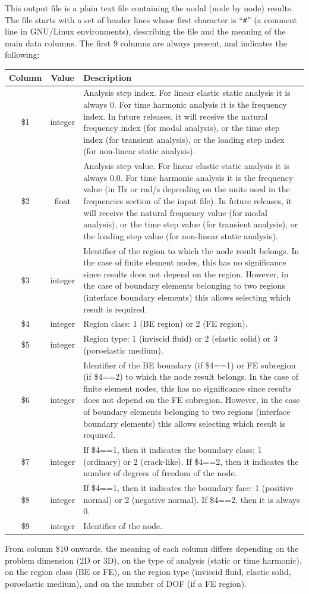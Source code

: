 \documentclass[a4paper,fleqn]{book}
\begin{document}
This output file is a plain text file containing the nodal (node by node) results. The file starts with a set of header lines whose first character is ``\texttt{\#}'' (a comment line in GNU/Linux environments), describing the file and the meaning of the main data columns. The first 9 columns are always present, and indicates the following:
\begin{longtable}{ccp{11cm}}
\textbf{Column} & \textbf{Value} &\textbf{Description} \\ 
\endhead
\midrule
\$1 & integer & Analysis step index. For linear elastic static analysis it is always 0. For time harmonic analysis it is the frequency index. In future releases, it will receive the natural frequency index (for modal analysis), or the time step index (for transient analysis), or the loading step index (for non-linear static analysis). \\
\$2 & float & Analysis step value. For linear elastic static analysis it is always 0.0. For time harmonic analysis it is the frequency value (in Hz or rad/s depending on the units used in the frequencies section of the input file). In future releases, it will receive the natural frequency value (for modal analysis), or the time step value (for transient analysis), or the loading step value (for non-linear static analysis). \\
\$3 & integer & Identifier of the region to which the node result belongs. In the case of finite element nodes, this has no significance since results does not depend on the region. However, in the case of boundary elements belonging to two regions (interface boundary elements) this allows selecting which result is required. \\
\$4 & integer & Region class: 1 (BE region) or 2 (FE region). \\
\$5 & integer & Region type: 1 (inviscid fluid) or 2 (elastic solid) or 3 (poroelastic medium). \\
\$6 & integer & Identifier of the BE boundary (if \$4==1) or FE subregion (if \$4==2) to which the node result belongs. In the case of finite element nodes, this has no significance since results does not depend on the FE subregion. However, in the case of boundary elements belonging to two regions (interface boundary elements) this allows selecting which result is required. \\
\$7 & integer & If \$4==1, then it indicates the boundary class: 1 (ordinary) or 2 (crack-like). If \$4==2, then it indicates the number of degrees of freedom of the node. \\
\$8 & integer & If \$4==1, then it indicates the boundary face: 1 (positive normal) or 2 (negative normal). If \$4==2, then it is always 0. \\
\$9 & integer & Identifier of the node. \\
\end{longtable}
From column \$10 onwards, the meaning of each column differs depending on the problem dimension (2D or 3D), on the type of analysis (static or time harmonic), on the region class (BE or FE), on the region type (inviscid fluid, elastic solid, poroelastic medium), and on the number of DOF (if a FE region).
\end{document}
